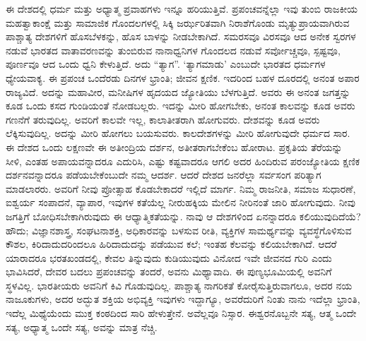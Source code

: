 ಈ ದೇಶದಲ್ಲಿ ಧರ್ಮ ಮತ್ತು ಅಧ್ಯಾತ್ಮ ಪ್ರವಾಹಗಳು ಇನ್ನೂ ಹರಿಯುತ್ತಿವೆ. ಪ್ರಪಂಚವನ್ನೆಲ್ಲಾ ಇವು ತುಂಬಿ ರಾಜಕೀಯ ಮಹತ್ವಾಕಾಂಕ್ಷೆ ಮತ್ತು ಸಾಮಾಜಿಕ ಗೊಂದಲಗಳಲ್ಲಿ ಸಿಕ್ಕಿ ಜರ್ಝರಿತವಾಗಿ ನಿರಾಶೆಗೊಂಡು ಮೃತ್ಯುಪ್ರಾಯವಾಗಿರುವ ಪಾಶ್ಚಾತ್ಯ ದೇಶಗಳಿಗೆ ಹೊಸಬೆಳಕನ್ನು, ಹೊಸ ಬಾಳನ್ನು ನೀಡಬೇಕಾಗಿದೆ. ಸಮರಸವೂ ವಿರಸವೂ ಆದ ಅನೇಕ ಸ್ವರಗಳ ನಡುವೆ ಭಾರತದ ವಾತಾವರಣವನ್ನು ತುಂಬಿರುವ ನಾನಾಧ್ವನಿಗಳ ಗೊಂದಲದ ನಡುವೆ ಸರ್ವೋಚ್ಚವೂ, ಸ್ಪಷ್ಟವೂ, ಪೂರ್ಣವೂ ಆದ ಒಂದು ಧ್ವನಿ ಕೇಳುತ್ತಿದೆ. ಅದು “ತ್ಯಾಗ”. ‘ತ್ಯಾಗಮಾಡು’ ಎಂಬುದೇ ಭಾರತದ ಧರ್ಮಗಳ ಧ್ಯೇಯವಾಕ್ಯ. ಈ ಪ್ರಪಂಚ ಒಂದೆರಡು ದಿನಗಳ ಭ್ರಾಂತಿ; ಜೀವನ ಕ್ಷಣಿಕ. ಇದರಿಂದ ಬಹಳ ದೂರದಲ್ಲಿ ಅನಂತ ಅಪಾರ ರಾಜ್ಯವಿದೆ. ಅದನ್ನು ಮಹಾವೀರ, ಮನೀಷಿಗಳ ಹೃದಯದ ಜ್ಯೋತಿಯು ಬೆಳಗುತ್ತಿದೆ. ಅವರು ಈ ಅನಂತ ಜಗತ್ತನ್ನು ಕೂಡ ಒಂದು ಕಸದ ಗುಂಡಿಯಂತೆ ನೋಡಬಲ್ಲರು. ಇದನ್ನು ಮೀರಿ ಹೋಗಬೇಕು, ಅನಂತ ಕಾಲವನ್ನು ಕೂಡ ಅವರು ಗಣನೆಗೆ ತರುವುದಿಲ್ಲ. ಅವರಿಗೆ ಕಾಲವೇ ಇಲ್ಲ, ಕಾಲಾತೀತರಾಗಿ ಹೋಗುವರು. ದೇಶವನ್ನು ಕೂಡ ಅವರು ಲೆಕ್ಕಿಸು\-ವುದಿಲ್ಲ. ಅದನ್ನು ಮೀರಿ ಹೋಗಲು ಬಯಸುವರು. ಕಾಲದೇಶಗಳನ್ನು ಮೀರಿ ಹೋಗುವುದೇ ಧರ್ಮದ ಸಾರ. ಈ ದೇಶದ ಒಂದು ಲಕ್ಷಣವೇ ಈ ಅತೀಂದ್ರಿಯ ದರ್ಶನ, ಅತೀತರಾಗಬೇಕೆಂಬ ಹೋರಾಟ. ಪ್ರಕೃತಿಯ ತೆರೆಯನ್ನು ಸೀಳಿ, ಎಂತಹ ಅಪಾಯವನ್ನಾದರೂ ಎದುರಿಸಿ, ಎಷ್ಟು ಕಷ್ಟವಾದರೂ ಆಗಲಿ ಅದರ ಹಿಂದಿರುವ ಪರಂಜ್ಯೋತಿಯ ಕ್ಷಣಿಕ ದರ್ಶನವನ್ನಾದರೂ ಪಡೆಯಬೇಕೆಂಬುದೇ ನಮ್ಮ ಆದರ್ಶ. ಆದರೆ ದೇಶದ ಜನರೆಲ್ಲಾ ಸರ್ವಸಂಗ ಪರಿತ್ಯಾಗ ಮಾಡಲಾರರು. ಅವರಿಗೆ ನೀವು ಪ್ರೋತ್ಸಾಹ ಕೊಡಬೇಕಾದರೆ ಇಲ್ಲಿದೆ ಮಾರ್ಗ. ನಿಮ್ಮ ರಾಜನೀತಿ, ಸಮಾಜ ಸುಧಾರಣೆ, ಐಶ್ವರ್ಯ ಸಂಪಾದನೆ, ವ್ಯಾಪಾರ, ಇವುಗಳ ಕತೆಯೆಲ್ಲ ನೀರುಹಕ್ಕಿಯ ಮೇಲಿನ ನೀರಿನಂತೆ ಜಾರಿ ಹೋಗುವುದು. ನೀವು ಜಗತ್ತಿಗೆ ಬೋಧಿಸಬೇಕಾಗಿರುವುದು ಈ ಆಧ್ಯಾತ್ಮಿಕತೆಯನ್ನು. ನಾವು ಆ ದೇಶಗಳಿಂದ ಏನನ್ನಾದರೂ ಕಲಿಯುವುದಿದೆಯೆ? ಹೌದು; ವಿಜ್ಞಾನಶಾಸ್ತ್ರ, ಸಂಘಟನಾಶಕ್ತಿ, ಅಧಿಕಾರವನ್ನು ಬಳಸುವ ರೀತಿ, ವ್ಯಕ್ತಿಗಳ ಸಾಮರ್ಥ್ಯವನ್ನು ವ್ಯವಸ್ಥೆಗೊಳಿಸುವ ಕೌಶಲ, ಕಿರಿದಾದುದರಿಂದಲೂ ಹಿರಿದಾದುದನ್ನು ಪಡೆಯುವ ಕಲೆ; ಇಂತಹ ಕೆಲವನ್ನು ಕಲಿಯಬೇಕಾಗಿದೆ. ಆದರೆ ಯಾರಾದರೂ ಭರತಖಂಡದಲ್ಲಿ, ಕೇವಲ ತಿನ್ನುವುದು ಕುಡಿಯುವುದು ವಿನೋದ ಇವೇ ಜೀವನದ ಗುರಿ ಎಂದು ಭಾವಿಸಿದರೆ, ದೇವರ ಬದಲು ಪ್ರಪಂಚವನ್ನು ತಂದರೆ, ಅವನು ಮಿಥ್ಯಾವಾದಿ. ಈ ಪುಣ್ಯಭೂಮಿಯಲ್ಲಿ ಅವನಿಗೆ ಸ್ಥಳವಿಲ್ಲ. ಭಾರತೀಯರು ಅವನಿಗೆ ಕಿವಿ ಗೊಡುವುದಿಲ್ಲ. ಪಾಶ್ಚಾತ್ಯ ನಾಗರಿಕತೆ ಕೋರೈಸುತ್ತಿರುವಾಗಲೂ, ಅದರ ನಯ ನಾಜೂಕುಗಳು, ಅದರ ಅದ್ಭುತ ಶಕ್ತಿಯ ಅಭಿವ್ಯಕ್ತಿ ಇವುಗಳು ಇದ್ದಾಗ್ಯೂ, ಅವರೆದುರಿಗೆ ನಿಂತು ನಾನು ಇದೆಲ್ಲಾ ಭ್ರಾಂತಿ, ಇದೆಲ್ಲ ಮಿಥ್ಯೆಯೆಂದು ಮುಕ್ತ ಕಂಠದಿಂದ ಸಾರಿ ಹೇಳುತ್ತೇನೆ. ಅವೆಲ್ಲವೂ ನಿಸ್ಸಾರ. ಈಶ್ವರನೊಬ್ಬನೇ ಸತ್ಯ, ಆತ್ಮ ಒಂದೇ ಸತ್ಯ, ಅಧ್ಯಾತ್ಮ ಒಂದೇ ಸತ್ಯ, ಅವನ್ನು ಮಾತ್ರ ನೆಚ್ಚಿ.

